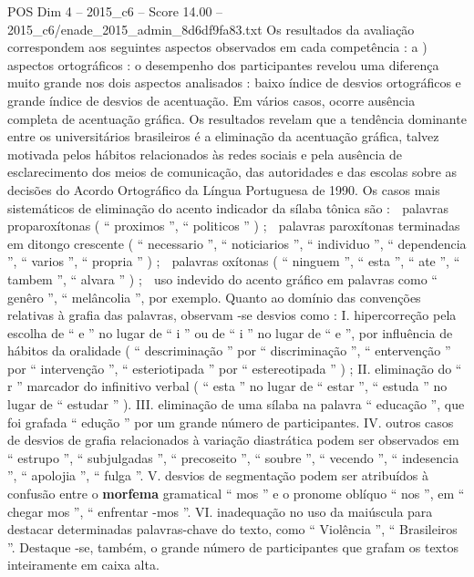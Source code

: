 \begin{textsample}{POS Dim 4 – 2015\_c6 – Score 14.00 – 2015\_c6/enade\_2015\_admin\_8d6df9fa83.txt}
Os resultados da avaliação correspondem aos seguintes aspectos observados em cada competência : a ) aspectos ortográficos : o desempenho dos participantes revelou uma diferença muito grande nos dois aspectos analisados : baixo índice de desvios ortográficos e grande índice de desvios de acentuação.
Em vários casos, ocorre ausência completa de acentuação gráfica.
Os resultados revelam que a tendência dominante entre os universitários brasileiros é a eliminação da acentuação gráfica, talvez motivada pelos hábitos relacionados às redes sociais e pela ausência de esclarecimento dos meios de comunicação, das autoridades e das escolas sobre as decisões do Acordo Ortográfico da Língua Portuguesa de 1990.
Os casos mais sistemáticos de eliminação do acento indicador da sílaba tônica são :  palavras proparoxítonas ( “ proximos ”, “ politicos ” ) ;  palavras paroxítonas terminadas em ditongo crescente ( “ necessario ”, “ noticiarios ”, “ individuo ”, “ dependencia ”, “ varios ”, “ propria ” ) ;  palavras oxítonas ( “ ninguem ”, “ esta ”, “ ate ”, “ tambem ”, “ alvara ” ) ;  uso indevido do acento gráfico em palavras como “ genêro ”, “ melâncolia ”, por exemplo.
Quanto ao domínio das convenções relativas à grafia das palavras, observam -se desvios como : I. hipercorreção pela escolha de “ e ” no lugar de “ i ” ou de “ i ” no lugar de “ e ”, por influência de hábitos da oralidade ( “ descriminação ” por “ discriminação ”, “ entervenção ” por “ intervenção ”, “ esteriotipada ” por “ estereotipada ” ) ; II. eliminação do “ r ” marcador do infinitivo verbal ( “ esta ” no lugar de “ estar ”, “ estuda ” no lugar de “ estudar ” ).
III. eliminação de uma sílaba na palavra “ educação ”, que foi grafada “ edução ” por um grande número de participantes.
IV. outros casos de desvios de grafia relacionados à variação diastrática podem ser observados em “ estrupo ”, “ subjulgadas ”, “ precoseito ”, “ soubre ”, “ vecendo ”, “ indesencia ”, “ apolojia ”, “ fulga ”.
V. desvios de segmentação podem ser atribuídos à confusão entre o \textbf{morfema} gramatical “ mos ” e o pronome oblíquo “ nos ”, em “ chegar mos ”, “ enfrentar -mos ”.
VI. inadequação no uso da maiúscula para destacar determinadas palavras-chave do texto, como “ Violência ”, “ Brasileiros ”.
Destaque -se, também, o grande número de participantes que grafam os textos inteiramente em caixa alta.

\end{textsample}

